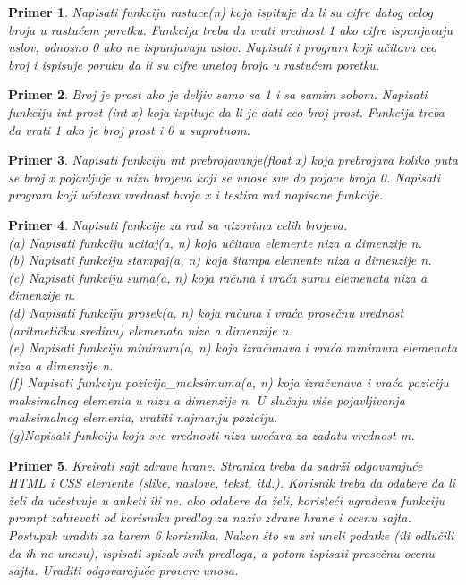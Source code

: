 \documentclass[a4paper]{article}
\newtheorem{primer}{Primer}[section]
\begin{document}
\begin{primer}
Napisati funkciju rastuce(n) koja ispituje da li
su cifre datog celog broja u rastućem poretku. Funkcija treba da vrati vrednost
1 ako cifre ispunjavaju uslov, odnosno 0 ako ne ispunjavaju uslov. Napisati i
program koji učitava ceo broj i ispisuje poruku da li su cifre unetog broja u
rastućem poretku.
\end{primer}

\begin{primer}
Broj je prost ako je deljiv samo sa 1 i sa samim sobom.
Napisati funkciju int prost (int x) koja ispituje da li je dati ceo broj prost.
Funkcija treba da vrati 1 ako je broj prost i 0 u suprotnom. 
\end{primer}

\begin{primer}
Napisati funkciju int prebrojavanje(float x) koja prebrojava
koliko puta se broj x pojavljuje u nizu brojeva koji se unose sve do pojave
broja 0. Napisati program koji učitava vrednost broja x i testira rad napisane
funkcije.
\end{primer}


\begin{primer}
Napisati funkcije za rad sa nizovima celih brojeva.\\
(a) Napisati funkciju ucitaj(a, n) koja učitava elemente niza a dimenzije n.\\
(b) Napisati funkciju stampaj(a, n) koja štampa elemente niza a dimenzije n.\\
(c) Napisati funkciju suma(a, n) koja računa i vraća sumu
elemenata niza a dimenzije n.\\
(d) Napisati funkciju prosek(a, n) koja računa i vraća prosečnu
vrednost (aritmetičku sredinu) elemenata niza a dimenzije n.\\
(e) Napisati funkciju minimum(a, n) koja izračunava i vraća
minimum elemenata niza a dimenzije n.\\
(f) Napisati funkciju pozicija\_maksimuma(a, n) koja izračunava
i vraća poziciju maksimalnog elementa u nizu a dimenzije n. U slučaju
više pojavljivanja maksimalnog elementa, vratiti najmanju poziciju.\\
(g)Napisati funkciju koja sve vrednosti niza uvećava za zadatu vrednost m.
\end{primer}

\begin{primer}
Kreirati sajt zdrave hrane. Stranica treba da sadrži odgovarajuće HTML i CSS elemente (slike, naslove, tekst, itd.). Korisnik treba da odabere da li želi da učestvuje u anketi ili ne. ako odabere da želi, koristeći ugrađenu funkciju prompt zahtevati od korisnika predlog za naziv zdrave hrane i ocenu sajta. Postupak uraditi za barem 6 korisnika. Nakon što su svi uneli podatke (ili odlučili da ih ne unesu), ispisati spisak svih predloga, a potom ispisati prosečnu ocenu sajta. Uraditi odgovarajuće provere unosa.   
\end{primer}
\end{document}
